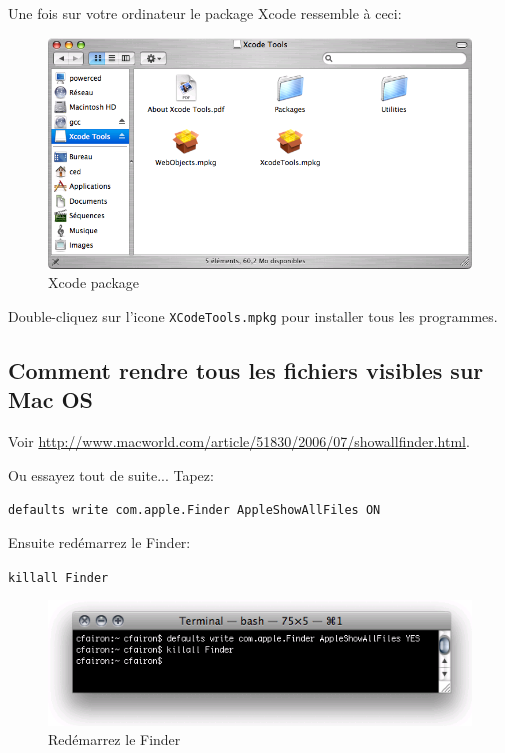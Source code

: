 \bigskip
\noindent Une fois sur votre ordinateur le package Xcode ressemble à ceci:

\begin{figure}[!h]
\begin{center}
\includegraphics[width=14cm]{resources/img/fig-mac5.png}
\caption{Xcode package\label{fig-mac5}}
\end{center}
\end{figure}


\bigskip
\noindent Double-cliquez sur l'icone \verb+XCodeTools.mpkg+  pour installer tous les
programmes.


\subsection{Comment rendre tous les fichiers visibles sur Mac OS}
\noindent Voir
\url{http://www.macworld.com/article/51830/2006/07/showallfinder.html}.

\bigskip
\noindent Ou essayez tout de suite... Tapez: 

\bigskip
\verb+defaults write com.apple.Finder AppleShowAllFiles ON+

\bigskip
\noindent Ensuite redémarrez le Finder:

\bigskip
\verb+killall Finder+

\begin{figure}[!h]
\begin{center}
\includegraphics[width=12cm]{resources/img/fig-mac6.png}
\caption{Redémarrez le Finder\label{fig-mac6}}
\end{center}
\end{figure}

